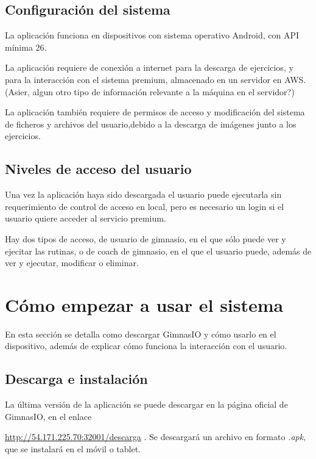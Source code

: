 \documentclass[11pt,a4paper]{report}
\begin{document}
\subsection{Configuración del sistema}
La aplicación funciona en dispositivos con sistema operativo Android, con API mínima 26.

La aplicación requiere de conexión a internet para la descarga de ejercicios, y para la interacción con el sistema premium, almacenado en un servidor en AWS.(Asier, algun otro tipo de información relevante a la máquina en el servidor?)

La aplicación también requiere de permisos de acceso y modificación del sistema de ficheros y archivos del usuario,debido a la descarga de imágenes junto a los ejercicios.

\subsection{Niveles de acceso del usuario}
Una vez la aplicación haya sido descargada el usuario puede ejecutarla sin requerimiento de control de acceso en local, pero es necesario un login si el usuario quiere acceder al servicio premium. 

Hay dos tipos de acceso, de usuario de gimnasio, en el que sólo puede ver y ejecitar las rutinas, o de coach de gimnasio, en el que el usuario puede, además de ver y ejecutar, modificar o eliminar.

\section{Cómo empezar a usar el sistema}
En esta sección se detalla como descargar GimnasIO y cómo usarlo en el dispositivo, además de explicar cómo funciona la interacción con el usuario.

\subsection{Descarga e instalación}
La última versión de la aplicación se puede descargar en la página oficial de GimnasIO, en el enlace 

\url{http://54.171.225.70:32001/descarga} . Se descargará un archivo en formato \textit{.apk}, que se instalará en el móvil o tablet.
\end{document}
